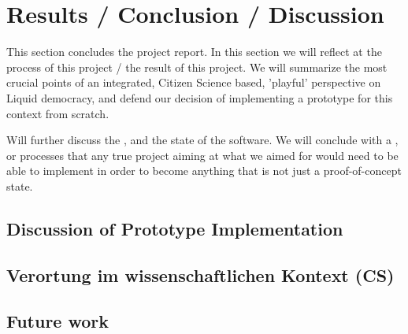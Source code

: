 \chapter{Results / Conclusion / Discussion}
\label{ch:Conclusion}


This section concludes the project report. In this section we will reflect at the process of this project / the result of this project. We will summarize the most crucial points of an integrated, Citizen Science based, 'playful' perspective on Liquid democracy, and defend our decision of implementing a prototype for this context from scratch.

Will further discuss the , and the state of the software. We will conclude with a , or processes that any true project aiming at what we aimed for would need to be able to implement in order to become anything that is not just a proof-of-concept state.

\section{Discussion of Prototype Implementation}
\label{sec:DiscussionImplementation}

\section{Verortung im wissenschaftlichen Kontext (CS)}
\label{sec:DiscussionScientificContext}

\section{Future work}
\label{sec:FutureWork}